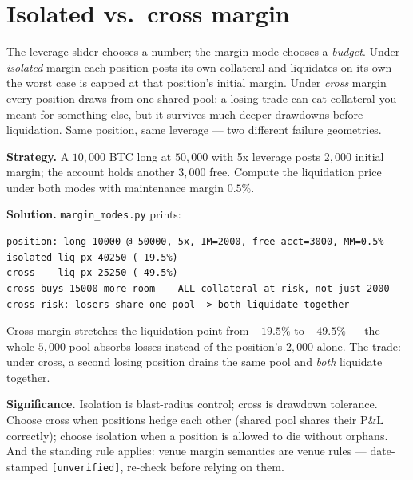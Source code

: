 \section{Isolated vs.\ cross margin}\label{sec:marginmodes}
The leverage slider chooses a number; the margin mode chooses a
\emph{budget}. Under \emph{isolated} margin each position posts
its own collateral and liquidates on its own --- the worst case is
capped at that position's initial margin. Under \emph{cross}
margin every position draws from one shared pool: a losing trade
can eat collateral you meant for something else, but it survives
much deeper drawdowns before liquidation. Same position, same
leverage --- two different failure geometries.

\begin{example}\label{ex:margmodes}
\textbf{Strategy.} A $10{,}000$ BTC long at $50{,}000$ with 5x
leverage posts $2{,}000$ initial margin; the account holds another
$3{,}000$ free. Compute the liquidation price under both modes with
maintenance margin $0.5\%$.

\textbf{Solution.} \texttt{margin\_modes.py} prints:
\begin{verbatim}
position: long 10000 @ 50000, 5x, IM=2000, free acct=3000, MM=0.5%
isolated liq px 40250 (-19.5%)
cross    liq px 25250 (-49.5%)
cross buys 15000 more room -- ALL collateral at risk, not just 2000
cross risk: losers share one pool -> both liquidate together
\end{verbatim}
Cross margin stretches the liquidation point from $-19.5\%$ to
$-49.5\%$ --- the whole $5{,}000$ pool absorbs losses instead of
the position's $2{,}000$ alone. The trade: under cross, a second
losing position drains the same pool and \emph{both} liquidate
together.

\textbf{Significance.} Isolation is blast-radius control; cross is
drawdown tolerance. Choose cross when positions hedge each other
(shared pool shares their P\&L correctly); choose isolation when a
position is allowed to die without orphans. And the standing rule
applies: venue margin semantics are venue rules --- date-stamped
\texttt{[unverified]}, re-check before relying on them.
\end{example}


